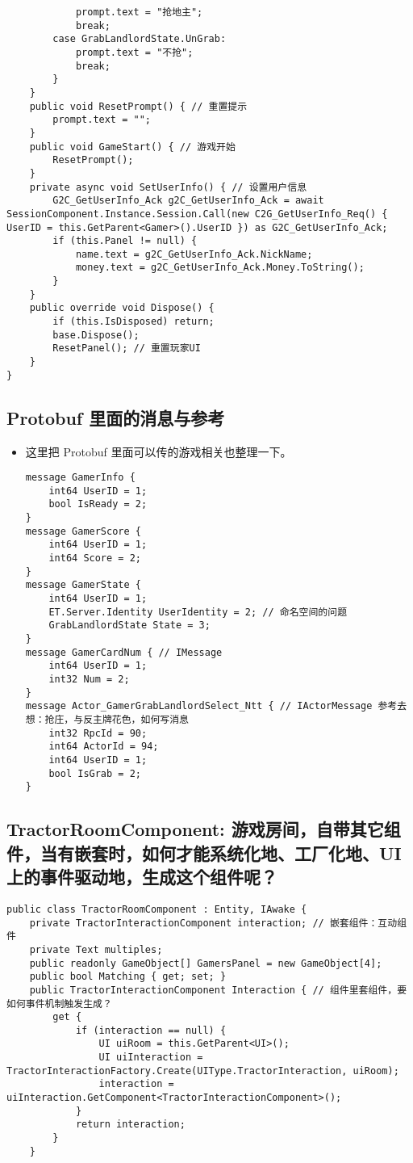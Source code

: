\documentclass[9pt, b5paper]{article}
\begin{document}
\begin{verbatim}
            prompt.text = "抢地主";
            break;
        case GrabLandlordState.UnGrab:
            prompt.text = "不抢";
            break;
        }
    }
    public void ResetPrompt() { // 重置提示
        prompt.text = "";
    }
    public void GameStart() { // 游戏开始
        ResetPrompt();
    }
    private async void SetUserInfo() { // 设置用户信息
        G2C_GetUserInfo_Ack g2C_GetUserInfo_Ack = await SessionComponent.Instance.Session.Call(new C2G_GetUserInfo_Req() { UserID = this.GetParent<Gamer>().UserID }) as G2C_GetUserInfo_Ack;
        if (this.Panel != null) {
            name.text = g2C_GetUserInfo_Ack.NickName;
            money.text = g2C_GetUserInfo_Ack.Money.ToString();
        }
    }
    public override void Dispose() {
        if (this.IsDisposed) return;
        base.Dispose();
        ResetPanel(); // 重置玩家UI
    }
}
\end{verbatim}
\subsection{Protobuf 里面的消息与参考}
\label{sec-3-6}
\begin{itemize}
\item 这里把 Protobuf 里面可以传的游戏相关也整理一下。
\begin{verbatim}
message GamerInfo {
    int64 UserID = 1;
    bool IsReady = 2;
}
message GamerScore {
    int64 UserID = 1;
    int64 Score = 2;
}
message GamerState {
    int64 UserID = 1;
    ET.Server.Identity UserIdentity = 2; // 命名空间的问题
	GrabLandlordState State = 3;
}
message GamerCardNum { // IMessage
    int64 UserID = 1;
    int32 Num = 2;
}
message Actor_GamerGrabLandlordSelect_Ntt { // IActorMessage 参考去想：抢庄，与反主牌花色，如何写消息 
    int32 RpcId = 90;
    int64 ActorId = 94;
    int64 UserID = 1;
    bool IsGrab = 2;
}
\end{verbatim}
\end{itemize}
\subsection{TractorRoomComponent: 游戏房间，自带其它组件，当有嵌套时，如何才能系统化地、工厂化地、UI 上的事件驱动地，生成这个组件呢？}
\label{sec-3-7}
\begin{verbatim}
public class TractorRoomComponent : Entity, IAwake {
    private TractorInteractionComponent interaction; // 嵌套组件：互动组件
    private Text multiples;
    public readonly GameObject[] GamersPanel = new GameObject[4];
    public bool Matching { get; set; }
    public TractorInteractionComponent Interaction { // 组件里套组件，要如何事件机制触发生成？
        get {
            if (interaction == null) {
                UI uiRoom = this.GetParent<UI>();
                UI uiInteraction = TractorInteractionFactory.Create(UIType.TractorInteraction, uiRoom);
                interaction = uiInteraction.GetComponent<TractorInteractionComponent>();
            }
            return interaction;
        }
    }
\end{verbatim}
\end{document}
